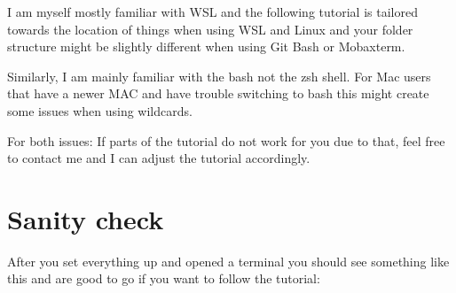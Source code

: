 \documentclass[
  letterpaper,
  DIV=11,
  numbers=noendperiod]{scrreprt}
\begin{document}
\begin{tcolorbox}[enhanced jigsaw, bottomtitle=1mm, toprule=.15mm, leftrule=.75mm, breakable, colbacktitle=quarto-callout-note-color!10!white, coltitle=black, titlerule=0mm, left=2mm, opacityback=0, bottomrule=.15mm, toptitle=1mm, colframe=quarto-callout-note-color-frame, title=\textcolor{quarto-callout-note-color}{\faInfo}\hspace{0.5em}{Note}, rightrule=.15mm, arc=.35mm, opacitybacktitle=0.6, colback=white]

I am myself mostly familiar with WSL and the following tutorial is
tailored towards the location of things when using WSL and Linux and
your folder structure might be slightly different when using Git Bash or
Mobaxterm.

Similarly, I am mainly familiar with the bash not the zsh shell. For Mac
users that have a newer MAC and have trouble switching to bash this
might create some issues when using wildcards.

For both issues: If parts of the tutorial do not work for you due to
that, feel free to contact me and I can adjust the tutorial accordingly.

\end{tcolorbox}

\section{Sanity check}\label{sanity-check}

After you set everything up and opened a terminal you should see
something like this and are good to go if you want to follow the
tutorial:
\end{document}
